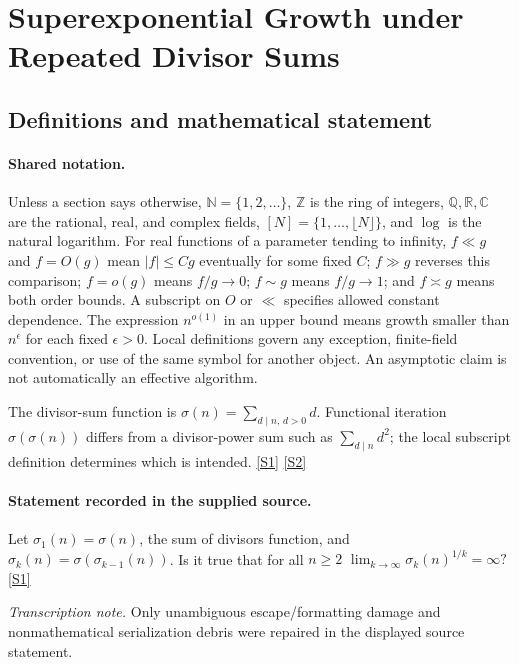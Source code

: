 \documentclass[11pt,a4paper]{article}
\newcommand{\N}{\mathbb{N}}
\newcommand{\Z}{\mathbb{Z}}
\newcommand{\Q}{\mathbb{Q}}
\newcommand{\R}{\mathbb{R}}
\newcommand{\C}{\mathbb{C}}
\newcommand{\sref}[2]{\hyperlink{source:#1:#2}{[S#2]}}
\begin{document}
\section{Superexponential Growth under Repeated Divisor Sums}\label{statement}


\subsection{Definitions and mathematical statement}

\paragraph{Shared notation.}Unless a section says otherwise, $\N=\{1,2,\ldots\}$,
$\Z$ is the ring of integers, $\Q,\R,\C$ are the rational, real, and complex
fields, $[N]=\{1,\ldots,\lfloor N\rfloor\}$, and $\log$ is the natural
logarithm. For real functions of a parameter tending to infinity,
$f\ll g$ and $f=O(g)$ mean $|f|\leq Cg$ eventually for some fixed $C$;
$f\gg g$ reverses this comparison; $f=o(g)$ means $f/g\to0$;
$f\sim g$ means $f/g\to1$; and $f\asymp g$ means both order bounds.
A subscript on $O$ or $\ll$ specifies allowed constant dependence.
The expression $n^{o(1)}$ in an upper bound means growth smaller than
$n^\epsilon$ for each fixed $\epsilon>0$. Local definitions govern any
exception, finite-field convention, or use of the same symbol for another
object. An asymptotic claim is not automatically an effective algorithm.



The divisor-sum function is $\sigma(n)=\sum_{d\mid n,\,d>0}d$. Functional iteration $\sigma(\sigma(n))$ differs from a divisor-power sum such as $\sum_{d\mid n}d^2$; the local subscript definition determines which is intended. \sref{statement}{1} \sref{statement}{2}

\paragraph{Statement recorded in the supplied source.}
Let $\sigma_1(n)=\sigma(n)$, the sum of divisors function, and $\sigma_k(n)=\sigma(\sigma_{k-1}(n))$. Is it true that for all $n\geq 2$ $ \lim_{k\to \infty} \sigma_k(n)^{1/k}=\infty? $ \sref{statement}{1}

{\small\emph{Transcription note.} Only unambiguous escape/formatting damage and nonmathematical serialization debris were repaired in the displayed source statement.}
\end{document}
